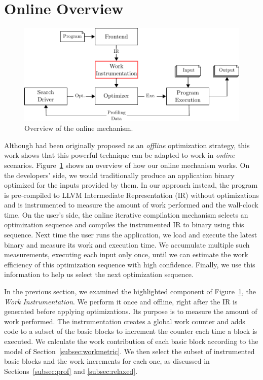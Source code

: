 \section{Online {\IterComp} Overview} \label{sec:oic-infra}

    \begin{figure}[t]
        \centering
        \includegraphics[width=\linewidth]{figs/infra-diagram}
        \caption{Overview of the online \itercomp mechanism.}
        \label{fig:infra-diagram}
    \end{figure}

    Although {\itercomp} had been originally proposed as an \textit{offline} optimization strategy, this work shows that this powerful
    technique can be adapted to work in \textit{online} scenarios. Figure~\ref{fig:infra-diagram} shows an overview of how our online
    {\itercomp} mechanism works. On the developers' side, we would traditionally produce an application binary optimized for the inputs
    provided by them. In our approach instead, the program is pre-compiled to LLVM Intermediate Representation (IR) without optimizations
    and is instrumented to measure the amount of work performed and the wall-clock time.
    On the user's side, the online iterative compilation mechanism selects an optimization sequence and compiles the instrumented IR to binary using this sequence.
    Next time the user runs the application, we load and execute the latest binary and measure its work and execution time. We accumulate
    multiple such measurements, executing each input only once, until we can estimate the work efficiency of this optimization sequence
    with high confidence. Finally, we use this information to help us select the next optimization sequence.
    
    In the previous section, we examined the highlighted component of Figure~\ref{fig:infra-diagram}, the \textit{Work Instrumentation}.
    We perform it once and offline, right after the IR is generated before applying optimizations. Its purpose is to measure the amount of
    work performed. The instrumentation creates a global work counter and adds code to a subset of the basic blocks to increment the counter
    each time a block is executed. We calculate the work contribution of each basic block according to the model of Section~\ref{subsec:workmetric}.
    We then select the subset of instrumented basic blocks and the work increments for each one, as discussed in Sections~\ref{subsec:prof}
    and \ref{subsec:relaxed}.
    
